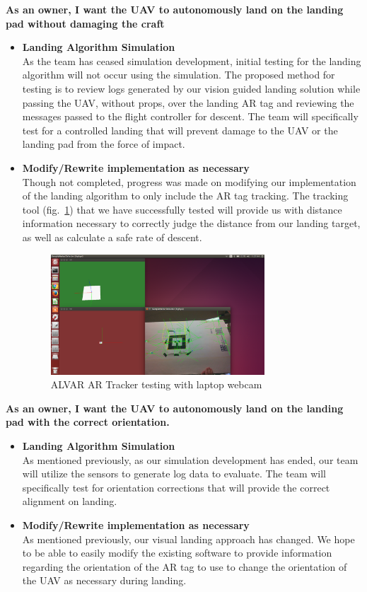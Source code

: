 \vspace{3mm}
\noindent \large{\textbf{As an owner, I want the UAV to autonomously land on the landing pad without damaging the craft}}
\normalsize
\begin{itemize}
\item \textbf{Landing Algorithm Simulation}\\
As the team has ceased simulation development, initial testing for the landing algorithm will not occur using the simulation. The proposed method for testing is to review logs generated by our vision guided landing solution while passing the UAV, without props, over the landing AR tag and reviewing the messages passed to the flight controller for descent. The team will specifically test for a controlled landing that will prevent damage to the UAV or the landing pad from the force of impact.
\item \textbf{Modify/Rewrite implementation as necessary}\\
Though not completed, progress was made on modifying our implementation of the landing algorithm to only include the AR tag tracking. The tracking tool (fig.~\ref{fig:artracker}) that we have successfully tested will provide us with distance information necessary to correctly judge the distance from our landing target, as well as calculate a safe rate of descent.
\begin{figure}[h]
\includegraphics[width=8cm]{AlvarExample.png}
\centering
\caption{ALVAR AR Tracker testing with laptop webcam}
\label{fig:artracker}
\end{figure}

\end{itemize}



\vspace{3mm}
\noindent \large{\textbf{As an owner, I want the UAV to autonomously land on the landing pad with the correct orientation.}}
\normalsize
\begin{itemize}
\item \textbf{Landing Algorithm Simulation}\\
As mentioned previously, as our simulation development has ended, our team will utilize the sensors to generate log data to evaluate. The team will specifically test for orientation corrections that will provide the correct alignment on landing.
\item \textbf{Modify/Rewrite implementation as necessary}\\
As mentioned previously, our visual landing approach has changed. We hope to be able to easily modify the existing software to provide information regarding the orientation of the AR tag to use to change the orientation of the UAV as necessary during landing.
\end{itemize}


